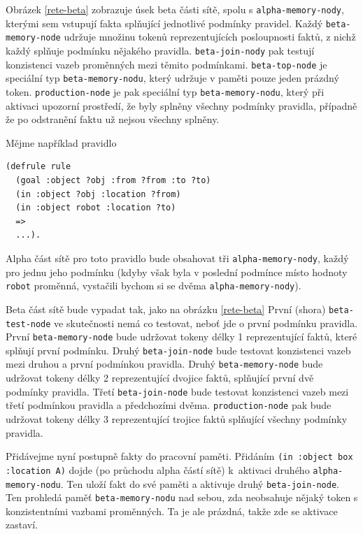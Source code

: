 Obrázek \ref{rete-beta} zobrazuje úsek beta části sítě, spolu s
\verb|alpha-memory-nody|, kterými sem vstupují fakta splňující jednotlivé
podmínky pravidel. Každý \verb|beta-memory-node| udržuje množinu tokenů
reprezentujících posloupnosti faktů, z nichž každý splňuje podmínku nějakého
pravidla. \verb|beta-join-nody| pak testují konzistenci vazeb proměnných mezi
těmito podmínkami. \verb|beta-top-node| je speciální typ
\verb|beta-memory-nodu|, který udržuje v paměti pouze jeden prázdný token.
\verb|production-node| je pak speciální typ \verb|beta-memory-nodu|, který
při aktivaci upozorní prostředí, že byly splněny všechny podmínky pravidla,
případně že po odstranění faktu už nejsou všechny splněny.

Mějme například pravidlo
\begin{verbatim}
(defrule rule
  (goal :object ?obj :from ?from :to ?to)
  (in :object ?obj :location ?from)
  (in :object robot :location ?to)
  =>
  ...).
\end{verbatim}
Alpha část sítě pro toto pravidlo bude obsahovat tři \verb|alpha-memory-nody|,
každý pro jednu jeho podmínku (kdyby však byla v poslední podmínce místo hodnoty
\verb|robot| proměnná, vystačili bychom si se dvěma \verb|alpha-memory-nody|).

Beta část sítě bude vypadat tak, jako na obrázku \ref{rete-beta} První (shora)
\verb|beta-test-node| ve skutečnosti nemá co testovat, neboť jde o první
podmínku pravidla. První \verb|beta-memory-node| bude udržovat tokeny délky 1
reprezentující  faktů, které splňují první podmínku.  Druhý
\verb|beta-join-node| bude testovat konzistenci vazeb mezi druhou a první
podmínkou pravidla. Druhý \verb|beta-memory-node| bude udržovat tokeny délky 2
reprezentující dvojice faktů, splňující první dvě podmínky pravidla.  Třetí
\verb|beta-join-node| bude testovat konzistenci vazeb mezi třetí podmínkou
pravidla a předchozími dvěma. \verb|production-node| pak bude udržovat tokeny
délky 3 reprezentující trojice faktů splňující všechny podmínky pravidla.


Přidávejme nyní postupně fakty do pracovní paměti. Přidáním
\verb|(in :object box :location A)| dojde (po průchodu alpha částí sítě)
k~aktivaci druhého \verb|alpha-memory-nodu|. Ten uloží fakt do své paměti a
aktivuje  druhý \verb|beta-join-node|. Ten prohledá paměť
\verb|beta-memory-nodu| nad sebou, zda neobsahuje nějaký token s konzistentními
vazbami proměnných. Ta je ale prázdná, takže zde se aktivace zastaví.

